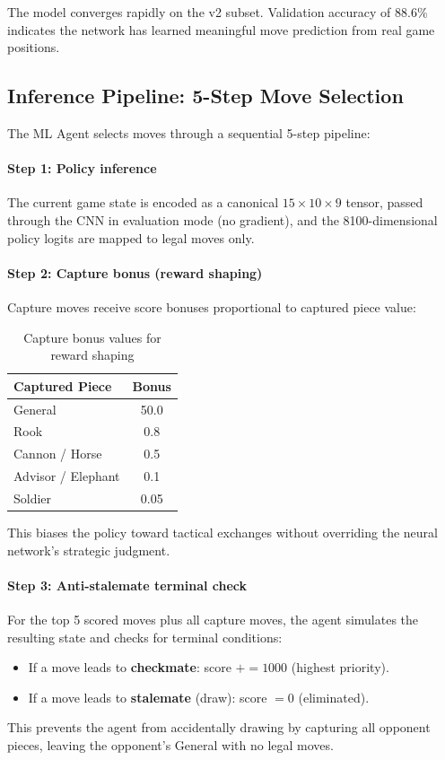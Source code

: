 \documentclass[a4paper,12pt]{article}
\begin{document}
The model converges rapidly on the v2 subset. Validation accuracy of 88.6\% indicates the network has learned meaningful move prediction from real game positions.

\subsection{Inference Pipeline: 5-Step Move Selection}

The ML Agent selects moves through a sequential 5-step pipeline:

\paragraph{Step 1: Policy inference}
The current game state is encoded as a canonical $15 \times 10 \times 9$ tensor, passed through the CNN in evaluation mode (no gradient), and the 8100-dimensional policy logits are mapped to legal moves only.

\paragraph{Step 2: Capture bonus (reward shaping)}
Capture moves receive score bonuses proportional to captured piece value:

\begin{table}[H]
\centering
\caption{Capture bonus values for reward shaping}
\begin{tabular}{@{}lc@{}}
\toprule
\textbf{Captured Piece} & \textbf{Bonus} \\
\midrule
General & 50.0 \\
Rook & 0.8 \\
Cannon / Horse & 0.5 \\
Advisor / Elephant & 0.1 \\
Soldier & 0.05 \\
\bottomrule
\end{tabular}
\end{table}

This biases the policy toward tactical exchanges without overriding the neural network's strategic judgment.

\paragraph{Step 3: Anti-stalemate terminal check}
For the top 5 scored moves plus all capture moves, the agent simulates the resulting state and checks for terminal conditions:
\begin{itemize}
    \item If a move leads to \textbf{checkmate}: score $+= 1000$ (highest priority).
    \item If a move leads to \textbf{stalemate} (draw): score $= 0$ (eliminated).
\end{itemize}
This prevents the agent from accidentally drawing by capturing all opponent pieces, leaving the opponent's General with no legal moves.
\end{document}
